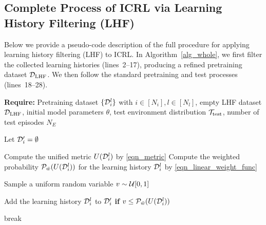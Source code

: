 \documentclass{article}
\begin{document}
\subsection{Complete Process of ICRL via Learning History Filtering (LHF)}
\label{append_complete_pseudocode}
Below we provide a pseudo-code description of the full procedure for
applying learning history filtering (LHF) to ICRL. In
Algorithm~\ref{alg_whole}, we first filter the collected learning histories (lines~2--17), producing a refined pretraining dataset ${\mathcal D}_{\text{LHF}}$. We then follow the standard pretraining and test processes (lines~18--28).
\begin{algorithm}
\caption{In-Context Reinforcement Learning via Learning History Filtering}         
\label{alg_whole}
\begin{algorithmic}[1]

        \STATE \textbf{Require:} Pretraining dataset $\{{\mathcal D}_i^l\}$ with $i \in [N_i], l \in [N_l]$, empty LHF dataset ${\mathcal D}_\text{LHF}$, initial model parameters $\theta$, test environment distribution ${\mathcal T}_{\text{test}}$, number of test episodes $N_E$

        \STATE {}

            \STATE Let ${\mathcal D}_i' = \emptyset$
                    

                    \STATE Compute the unified metric $U({\mathcal D}_i^l)$ by \eqref{eqn_metric}
                    \STATE Compute the weighted probability $\mathcal{P}_{\bar{w}}(U({\mathcal D}_i^l))$ for the learning history ${\mathcal D}_i^l$ by \eqref{eqn_linear_weight_func}
            
                    \STATE Sample a uniform random variable $v \sim {\ensuremath{\mathcal U}}[0, 1]$

                    \STATE Add the learning history ${\mathcal D}_i^l$ to ${\mathcal D}_i'$ \textbf{if} $v \leq \mathcal{P}_{\bar{w}}(U({\mathcal D}_i^l))$
                    
                    \STATE break
                    \ENDIF
                \ENDFOR
            \ENDWHILE
 

\end{algorithmic}
\end{algorithm}
\end{document}
